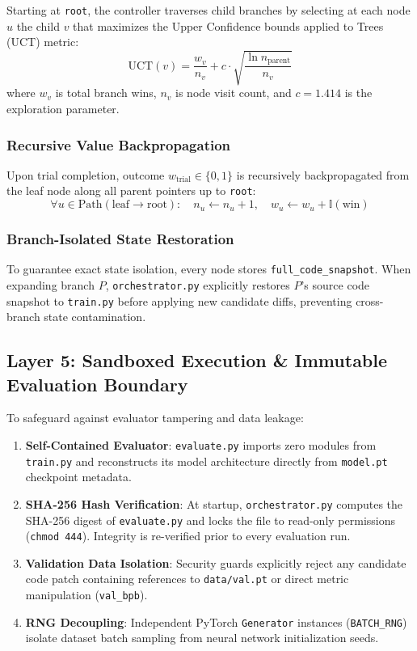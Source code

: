 \documentclass[10pt,twocolumn,3p,times]{article}
\begin{document}
Starting at \texttt{root}, the controller traverses child branches by selecting at each node $u$ the child $v$ that maximizes the Upper Confidence bounds applied to Trees (UCT) metric:
\begin{equation}
    \text{UCT}(v) = \frac{w_v}{n_v} + c \cdot \sqrt{\frac{\ln n_{\text{parent}}}{n_v}}
    \label{eq:uct_formula}
\end{equation}
where $w_v$ is total branch wins, $n_v$ is node visit count, and $c = 1.414$ is the exploration parameter.

\subsubsection{Recursive Value Backpropagation}

Upon trial completion, outcome $w_{\text{trial}} \in \{0, 1\}$ is recursively backpropagated from the leaf node along all parent pointers up to \texttt{root}:
\begin{equation}
    \forall u \in \text{Path}(\text{leaf} \to \text{root}): \quad n_u \leftarrow n_u + 1, \quad w_u \leftarrow w_u + \mathbb{I}(\text{win})
\end{equation}

\subsubsection{Branch-Isolated State Restoration}

To guarantee exact state isolation, every node stores \texttt{full\_code\_snapshot}. When expanding branch $P$, \texttt{orchestrator.py} explicitly restores $P$'s source code snapshot to \texttt{train.py} before applying new candidate diffs, preventing cross-branch state contamination.

\subsection{Layer 5: Sandboxed Execution \& Immutable Evaluation Boundary}

To safeguard against evaluator tampering and data leakage:
\begin{enumerate}
    \item \textbf{Self-Contained Evaluator}: \texttt{evaluate.py} imports zero modules from \texttt{train.py} and reconstructs its model architecture directly from \texttt{model.pt} checkpoint metadata.
    \item \textbf{SHA-256 Hash Verification}: At startup, \texttt{orchestrator.py} computes the SHA-256 digest of \texttt{evaluate.py} and locks the file to read-only permissions (\texttt{chmod 444}). Integrity is re-verified prior to every evaluation run.
    \item \textbf{Validation Data Isolation}: Security guards explicitly reject any candidate code patch containing references to \texttt{data/val.pt} or direct metric manipulation (\texttt{val\_bpb}).
    \item \textbf{RNG Decoupling}: Independent PyTorch \texttt{Generator} instances (\texttt{BATCH\_RNG}) isolate dataset batch sampling from neural network initialization seeds.
\end{enumerate}
\end{document}
